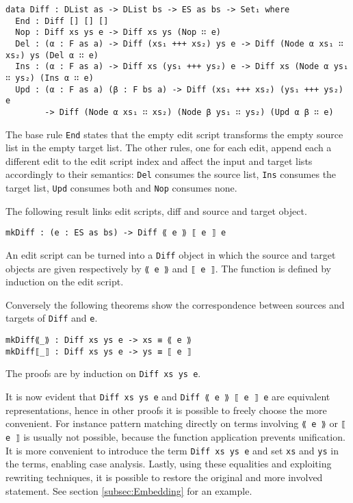 \documentclass[../Thesis.tex]{subfiles}
\begin{document}
\begin{verbatim}
data Diff : DList as -> DList bs -> ES as bs -> Set₁ where
  End : Diff [] [] []
  Nop : Diff xs ys e -> Diff xs ys (Nop ∷ e)
  Del : (α : F as a) -> Diff (xs₁ +++ xs₂) ys e -> Diff (Node α xs₁ ∷ xs₂) ys (Del α ∷ e)
  Ins : (α : F as a) -> Diff xs (ys₁ +++ ys₂) e -> Diff xs (Node α ys₁ ∷ ys₂) (Ins α ∷ e)
  Upd : (α : F as a) (β : F bs a) -> Diff (xs₁ +++ xs₂) (ys₁ +++ ys₂) e 
        -> Diff (Node α xs₁ ∷ xs₂) (Node β ys₁ ∷ ys₂) (Upd α β ∷ e)
\end{verbatim}	

	The base rule \texttt{End} states that the empty edit script 
	transforms the empty source list in the empty target list.
	The other rules, one for each edit, append each a different edit 
	to the edit script 	index and affect the input and target lists 
	accordingly to their 	semantics: 
	\texttt{Del} consumes the source list, \texttt{Ins} consumes the target list, 
	\texttt{Upd} consumes both and \texttt{Nop} consumes none.	

	The following result links edit scripts, diff and source and target object.
	
\begin{verbatim}	
mkDiff : (e : ES as bs) -> Diff ⟪ e ⟫ ⟦ e ⟧ e
\end{verbatim}

	An edit script can be turned into a \texttt{Diff} object in which the
	source and target objects are given respectively by \texttt{⟪ e ⟫} and 
	\texttt{⟦ e ⟧}.
	The function is defined by induction on the edit script.
	
	Conversely the following theorems show the correspondence
	between sources and targets of \texttt{Diff} and \texttt{e}. 

\begin{verbatim}
mkDiff⟪_⟫ : Diff xs ys e -> xs ≡ ⟪ e ⟫
mkDiff⟦_⟧ : Diff xs ys e -> ys ≡ ⟦ e ⟧
\end{verbatim}

	The proofs are by induction on \texttt{Diff xs ys e}.
	
	It is now evident that \texttt{Diff xs ys e} and \texttt{Diff  ⟪ e ⟫ ⟦ e ⟧ e} 
	are equivalent	representations, hence in other proofs it is possible to freely 
	choose the more convenient. 
	For instance pattern matching directly on terms involving \texttt{⟪ e ⟫} or
	\texttt{⟦ e ⟧}	is usually not possible, because the function application
	prevents unification. It is more convenient to introduce the term
	\texttt{Diff xs ys e} and set \texttt{xs} and \texttt{ys} in the terms, 
	enabling case analysis. Lastly, using 
	these equalities and exploiting rewriting techniques, it is possible
	to restore the original and more involved statement.
	See section \ref{subsec:Embedding} for an example.
	
\end{document}
